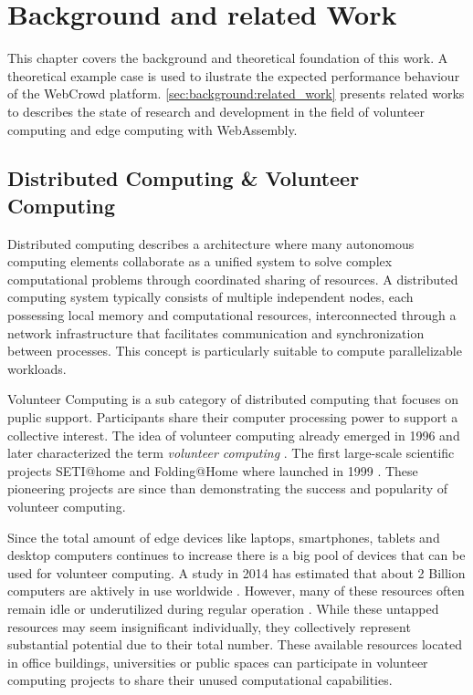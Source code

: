 \chapter{Background and related Work}
\label{ch:background}
This chapter covers the background and theoretical foundation of this work. A theoretical example case is used to ilustrate the expected performance behaviour of the WebCrowd platform. \autoref{sec:background:related_work} presents related works to describes the state of research and development in the field of volunteer computing and edge computing with WebAssembly.

\section{Distributed Computing \& Volunteer Computing}
Distributed computing describes a architecture where many autonomous computing elements collaborate as a unified system to solve complex computational problems through coordinated sharing of resources. A distributed computing system typically consists of multiple independent nodes, each possessing local memory and computational resources, interconnected through a network infrastructure that facilitates communication and synchronization between processes. This concept is particularly suitable to compute parallelizable workloads.

Volunteer Computing is a sub category of distributed computing that focuses on puplic support. Participants share their computer processing power to support a collective interest. The idea of volunteer computing already emerged in 1996 \cite{relatedwork:boinc1} and \citeauthor{background:vcname} later characterized the term \emph{volunteer computing} \cite{background:vcname}. The first large-scale scientific projects SETI@home and Folding@Home where launched in 1999 \cite{relatedwork:boinc1,relatedwork:seti}. These pioneering projects are since than demonstrating the success and popularity of volunteer computing.

Since the total amount of edge devices like laptops, smartphones, tablets and desktop computers continues to increase \cite{background:amountdeviceses,relatedwork:boinc1} there is a big pool of devices that can be used for volunteer computing. A study in 2014 has estimated that about 2 Billion computers are aktively in use worldwide \cite{intro:computersAmount}. However, many of these resources often remain idle or underutilized during regular operation \cite{relatedwork:mobilecloud, relatedwork:wasmedgecomputing}. While these untapped resources may seem insignificant individually, they collectively represent substantial potential due to their total number. These available resources located in office buildings, universities or public spaces can participate in volunteer computing projects to share their unused computational capabilities.

